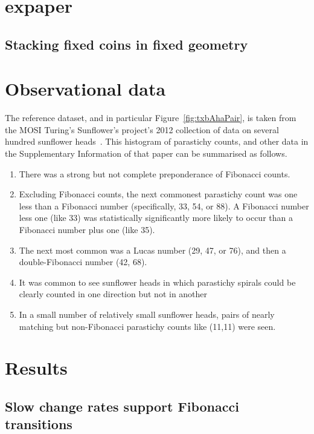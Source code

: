 \section{expaper}

  
 
\subsection{Stacking fixed coins in fixed geometry}


\section{Observational data}
The reference dataset, and in particular Figure~\ref{fig:txbAhaPair},  is taken from the MOSI Turing's Sunflower's project's 2012 collection of data on several hundred sunflower heads~\cite{swintonNovelFibonacciNonFibonacci2016}.    This histogram of parastichy counts, and other data in the Supplementary Information of that paper can be summarised as follows.
\begin{enumerate}
	\item There was a strong but not complete preponderance of Fibonacci counts.
	\item	Excluding Fibonacci counts, the next commonest parastichy count was one less than a Fibonacci number (specifically, 33, 54, or 88).  A Fibonacci number less one (like 33) was statistically significantly more likely to occur than a Fibonacci number plus one (like 35).
	\item The next most common was a Lucas number (29, 47, or 76), and then a double-Fibonacci number (42, 68).
	\item It was common to see sunflower heads in which parastichy spirals could be clearly counted in one direction but not in another
	\item In a small number of relatively small sunflower heads, pairs of nearly matching but non-Fibonacci parastichy counts like (11,11)  were seen.
\end{enumerate}



\section{Results}

 


\subsection{Slow change rates support Fibonacci transitions}


